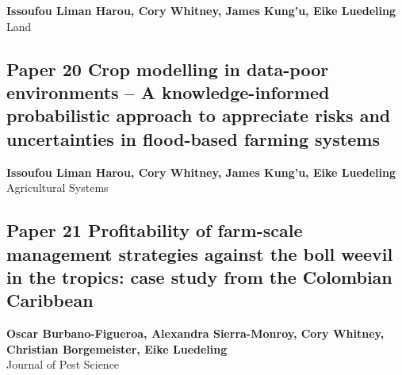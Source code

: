 \documentclass[
]{article}
\begin{document}
\begin{center}
\vspace*{2cm}
{\Large \textbf{Issoufou Liman Harou, Cory Whitney, James Kung’u, Eike Luedeling}} \\[0.5cm]
\vspace*{1cm}
{\Large Land} \\[2cm]
\end{center}


\newpage

\hypertarget{liman_harou_crop_2021}{%
\subsection{Paper 20 Crop modelling in data-poor environments -- A
knowledge-informed probabilistic approach to appreciate risks and
uncertainties in flood-based farming
systems}\label{liman_harou_crop_2021}}

\begin{center}
\vspace*{2cm}
{\Large \textbf{Issoufou Liman Harou, Cory Whitney, James Kung'u, Eike Luedeling}} \\[0.5cm]
\vspace*{1cm}
{\Large Agricultural Systems} \\[2cm]
\end{center}


\newpage

\hypertarget{burbano-figueroa_profitability_2022}{%
\subsection{Paper 21 Profitability of farm-scale management strategies
against the boll weevil in the tropics: case study from the Colombian
Caribbean}\label{burbano-figueroa_profitability_2022}}

\begin{center}
\vspace*{2cm}
{\Large \textbf{Oscar Burbano-Figueroa, Alexandra Sierra-Monroy, Cory Whitney, Christian Borgemeister, Eike Luedeling}} \\[0.5cm]
\vspace*{1cm}
{\Large Journal of Pest Science} \\[2cm]
\end{center}

\end{document}
